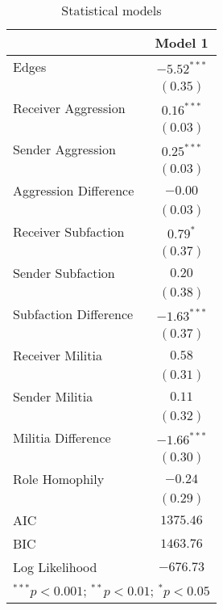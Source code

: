 
\begin{table}
\begin{center}
\begin{tabular}{l c}
\hline
 & Model 1 \\
\hline
Edges                 & $-5.52^{***}$ \\
                      & $(0.35)$      \\
Receiver Aggression   & $0.16^{***}$  \\
                      & $(0.03)$      \\
Sender Aggression     & $0.25^{***}$  \\
                      & $(0.03)$      \\
Aggression Difference & $-0.00$       \\
                      & $(0.03)$      \\
Receiver Subfaction   & $0.79^{*}$    \\
                      & $(0.37)$      \\
Sender Subfaction     & $0.20$        \\
                      & $(0.38)$      \\
Subfaction Difference & $-1.63^{***}$ \\
                      & $(0.37)$      \\
Receiver Militia      & $0.58$        \\
                      & $(0.31)$      \\
Sender Militia        & $0.11$        \\
                      & $(0.32)$      \\
Militia Difference    & $-1.66^{***}$ \\
                      & $(0.30)$      \\
Role Homophily        & $-0.24$       \\
                      & $(0.29)$      \\
\hline
AIC                   & $1375.46$     \\
BIC                   & $1463.76$     \\
Log Likelihood        & $-676.73$     \\
\hline
\multicolumn{2}{l}{\scriptsize{$^{***}p<0.001$; $^{**}p<0.01$; $^{*}p<0.05$}}
\end{tabular}
\caption{Statistical models}
\label{tab:ergm-baseline}
\end{center}
\end{table}
